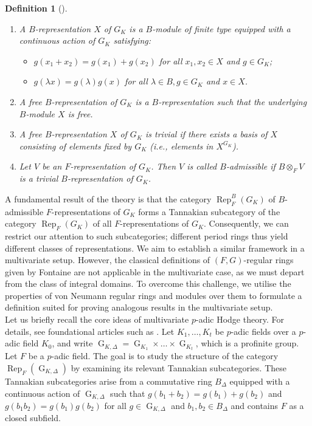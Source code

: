 \documentclass{amsart}
\newtheorem{definition}[proposition]{Definition}
\DeclareMathOperator{\G}{G}
\DeclareMathOperator{\Rep}{Rep}
\begin{document}
\begin{definition}[\cite{Fontaine}]\label{Free Representations definition}
    \begin{enumerate}
        \item[(i)] A \emph{$B$-representation} $X$ of $G_K$ is a $B$-module of finite type equipped with a continuous action of $G_K$ satisfying:
        \begin{itemize}
            \item $g(x_1+x_2)=g(x_1)+g(x_2)$ for all $x_1,x_2\in X$ and $g\in G_K$;
            \item $g(\lambda x)=g(\lambda)g(x)$ for all $\lambda\in B, g\in G_K$ and $x\in X$.
        \end{itemize}
        \item[(ii)] A \emph{free $B$-representation} of $G_K$ is a $B$-representation such that the underlying $B$-module $X$ is free.
        \item[(iii)] A free $B$-representation $X$ of $G_K$ is \emph{trivial} if there exists a basis of $X$ consisting of elements fixed by $G_K$ (i.e., elements in $X^{G_K}$).
        \item[(iv)] Let $V$ be an $F$-representation of $G_K$. Then $V$ is called \emph{$B$-admissible} if $B\otimes_F V$ is a trivial $B$-representation of $G_K$.
    \end{enumerate}
\end{definition}

A fundamental result of the theory is that the category $\Rep^B_F(G_K)$ of $B$-admissible $F$-representations of $G_K$ forms a Tannakian subcategory of the category $\Rep_F(G_K)$ of all $F$-representations of $G_K$. Consequently, we can restrict our attention to such subcategories; different period rings thus yield different classes of representations. We aim to establish a similar framework in a multivariate setup. However, the classical definitions of $(F,G)$-regular rings given by Fontaine \cite{Fontaine} are not applicable in the multivariate case, as we must depart from the class of integral domains. To overcome this challenge, we utilise the properties of von Neumann regular rings and modules over them to formulate a definition suited for proving analogous results in the multivariate setup.\\

Let us briefly recall the core ideas of multivariate $p$-adic Hodge theory. For details, see foundational articles such as \cite{Zab, Zab2, Pal-Zab, CarKedZab, BCM}. Let $K_1, \dots, K_t$ be $p$-adic fields over a $p$-adic field $K_0$, and write $\G_{K,\Delta} = \G_{K_1} \times \dots \times \G_{K_t}$, which is a profinite group. Let $F$ be a $p$-adic field. The goal is to study the structure of the category $\Rep_F(\G_{K,\Delta})$ by examining its relevant Tannakian subcategories. These Tannakian subcategories arise from a commutative ring $B_\Delta$ equipped with a continuous action of $\G_{K,\Delta}$ such that $g(b_1+b_2) = g(b_1) + g(b_2)$ and $g(b_1b_2) = g(b_1)g(b_2)$ for all $g \in \G_{K,\Delta}$ and $b_1, b_2 \in B_\Delta$ and contains $F$ as a closed subfield.\\
\end{document}
